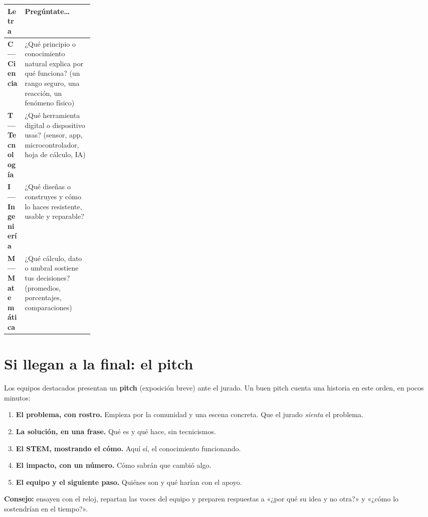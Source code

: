 \documentclass[11pt, letterpaper]{article}
\begin{document}
\begin{center}
\renewcommand{\arraystretch}{1.3}
\begin{tabularx}{\linewidth}{@{}p{0.20\linewidth} X@{}}
\toprule
\textbf{\color{smjAzul}Letra} & \textbf{\color{smjAzul}Pregúntate\ldots}\\
\midrule
\textbf{C — Ciencia} & ¿Qué principio o conocimiento natural explica por qué funciona? (un rango seguro, una reacción, un fenómeno físico)\\
\textbf{T — Tecnología} & ¿Qué herramienta digital o dispositivo usas? (sensor, app, microcontrolador, hoja de cálculo, IA)\\
\textbf{I — Ingeniería} & ¿Qué diseñas o construyes y cómo lo haces resistente, usable y reparable?\\
\textbf{M — Matemática} & ¿Qué cálculo, dato o umbral sostiene tus decisiones? (promedios, porcentajes, comparaciones)\\
\bottomrule
\end{tabularx}
\end{center}

\section{Si llegan a la final: el pitch}

Los equipos destacados presentan un \textbf{pitch} (exposición breve) ante el jurado. Un buen pitch cuenta una historia en este orden, en pocos minutos:

\begin{enumerate}[label=\textbf{\arabic*.}]
  \item \textbf{El problema, con rostro.} Empieza por la comunidad y una escena concreta. Que el jurado \emph{sienta} el problema.
  \item \textbf{La solución, en una frase.} Qué es y qué hace, sin tecnicismos.
  \item \textbf{El STEM, mostrando el cómo.} Aquí sí, el conocimiento funcionando.
  \item \textbf{El impacto, con un número.} Cómo sabrán que cambió algo.
  \item \textbf{El equipo y el siguiente paso.} Quiénes son y qué harían con el apoyo.
\end{enumerate}
\noindent\textbf{Consejo:} ensayen con el reloj, repartan las voces del equipo y preparen respuestas a «¿por qué su idea y no otra?» y «¿cómo lo sostendrían en el tiempo?».
\end{document}
